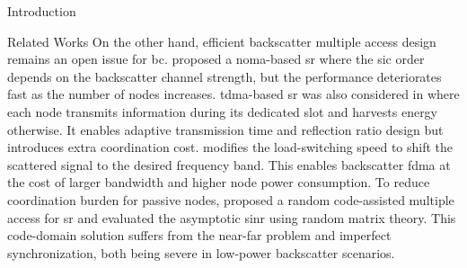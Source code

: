 \documentclass[journal]{IEEEtran}
\begin{document}
\begin{section}{Introduction}
\begin{subsection}{Related Works}
		On the other hand, efficient backscatter multiple access design remains an open issue for \gls{bc}.
		\cite{Xu2021a} proposed a \gls{noma}-based \gls{sr} where the \gls{sic} order depends on the backscatter channel strength, but the performance deteriorates fast as the number of nodes increases.
		\gls{tdma}-based \gls{sr} was also considered in \cite{Yang2021a} where each node transmits information during its dedicated slot and harvests energy otherwise.
		It enables adaptive transmission time and reflection ratio design but introduces extra coordination cost.
		\cite{Vougioukas2019} modifies the load-switching speed to shift the scattered signal to the desired frequency band.
		This enables backscatter \gls{fdma} at the cost of larger bandwidth and higher node power consumption.
		To reduce coordination burden for passive nodes, \cite{Han2021} proposed a random code-assisted multiple access for \gls{sr} and evaluated the asymptotic \gls{sinr} using random matrix theory.
		This code-domain solution suffers from the near-far problem and imperfect synchronization, both being severe in low-power backscatter scenarios.


\end{subsection}
\end{section}
\end{document}

